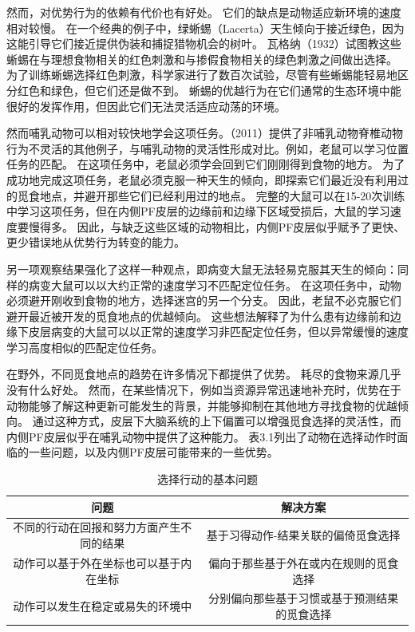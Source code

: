 然而，对优势行为的依赖有代价也有好处。
它们的缺点是动物适应新环境的速度相对较慢。
在一个经典的例子中，绿蜥蜴（Lacerta）天生倾向于接近绿色，因为这能引导它们接近提供伪装和捕捉猎物机会的树叶。
瓦格纳（1932）试图教这些蜥蜴在与理想食物相关的红色刺激和与掺假食物相关的绿色刺激之间做出选择。
为了训练蜥蜴选择红色刺激，科学家进行了数百次试验，尽管有些蜥蜴能轻易地区分红色和绿色，但它们还是做不到。
蜥蜴的优越行为在它们通常的生态环境中能很好的发挥作用，但因此它们无法灵活适应动荡的环境。\par


然而哺乳动物可以相对较快地学会这项任务。\cite{Murray et al}（2011）提供了非哺乳动物脊椎动物行为不灵活的其他例子，与哺乳动物的灵活性形成对比。例如，老鼠可以学习位置任务的匹配。
在这项任务中，老鼠必须学会回到它们刚刚得到食物的地方\cite{arighetto et al,1998}。
为了成功地完成这项任务，老鼠必须克服一种天生的倾向，即探索它们最近没有利用过的觅食地点，并避开那些它们已经利用过的地点。
完整的大鼠可以在15-20次训练中学习这项任务，但在内侧PF皮层的边缘前和边缘下区域受损后，大鼠的学习速度要慢得多\cite{Dias&Aggleton 2000}。
因此，与缺乏这些区域的动物相比，内侧PF皮层似乎赋予了更快、更少错误地从优势行为转变的能力。\par


另一项观察结果强化了这样一种观点，即病变大鼠无法轻易克服其天生的倾向：同样的病变大鼠可以以大约正常的速度学习不匹配定位任务\cite{Dias&Aggleton 2000}。
在这项任务中，动物必须避开刚收到食物的地方，选择迷宫的另一个分支。
因此，老鼠不必克服它们避开最近被开发的觅食地点的优越倾向。
这些想法解释了为什么患有边缘前和边缘下皮层病变的大鼠可以以正常的速度学习非匹配定位任务，但以异常缓慢的速度学习高度相似的匹配定位任务。\par


在野外，不同觅食地点的趋势在许多情况下都提供了优势。
耗尽的食物来源几乎没有什么好处。
然而，在某些情况下，例如当资源异常迅速地补充时，优势在于动物能够了解这种更新可能发生的背景，并能够抑制在其他地方寻找食物的优越倾向。
通过这种方式，皮层下大脑系统的上下偏置可以增强觅食选择的灵活性，而内侧PF皮层似乎在哺乳动物中提供了这种能力。
表3.1列出了动物在选择动作时面临的一些问题，以及内侧PF皮层可能带来的一些优势。\par


\begin{table}[htbp]
	\newcommand{\tabincell}[2]{\begin{tabular}{@{}#1@{}}#2\end{tabular}} %
	\centering
	\caption{选择行动的基本问题}
	\renewcommand\arraystretch{1.5}	%
	\begin{tabular}{c c }	 %
		\hline	%
		问题 & 解决方案 \\	
		\hline  %
		不同的行动在回报和努力方面产生不同的结果 & 基于习得动作-结果关联的偏倚觅食选择 \\
		\hline
		动作可以基于外在坐标也可以基于内在坐标 & 偏向于那些基于外在或内在规则的觅食选择 \\
		\hline
		动作可以发生在稳定或易失的环境中 & 分别偏向那些基于习惯或基于预测结果的觅食选择 \\
		\hline
	\end{tabular}%
\end{table}%



